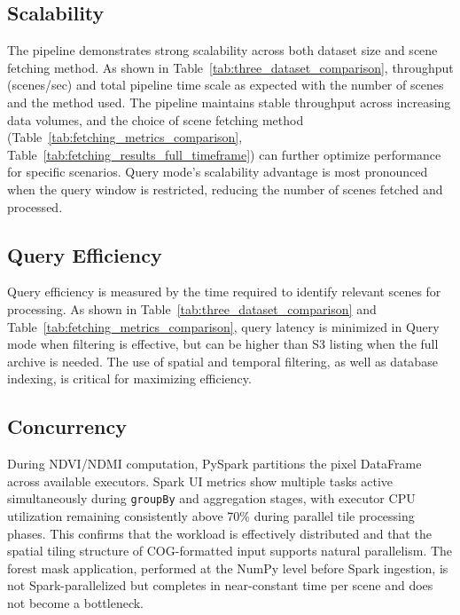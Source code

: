 \subsection{Scalability}
\label{sec:scalability}
The pipeline demonstrates strong scalability across both dataset size and scene fetching method. As shown in Table~\ref{tab:three_dataset_comparison}, throughput (scenes/sec) and total pipeline time scale as expected with the number of scenes and the method used. The pipeline maintains stable throughput across increasing data volumes, and the choice of scene fetching method (Table~\ref{tab:fetching_metrics_comparison}, Table~\ref{tab:fetching_results_full_timeframe}) can further optimize performance for specific scenarios. Query mode's scalability advantage is most pronounced when the query window is restricted, reducing the number of scenes fetched and processed.


\subsection{Query Efficiency}
\label{sec:query_efficiency}
Query efficiency is measured by the time required to identify relevant scenes for processing. As shown in Table~\ref{tab:three_dataset_comparison} and Table~\ref{tab:fetching_metrics_comparison}, query latency is minimized in Query mode when filtering is effective, but can be higher than S3 listing when the full archive is needed. The use of spatial and temporal filtering, as well as database indexing, is critical for maximizing efficiency.


\subsection{Concurrency}

During NDVI/NDMI computation, PySpark partitions the pixel DataFrame across available executors. Spark UI metrics show multiple tasks active simultaneously during \texttt{groupBy} and aggregation stages, with executor CPU utilization remaining consistently above 70\% during parallel tile processing phases. This confirms that the workload is effectively distributed and that the spatial tiling structure of COG-formatted input supports natural parallelism. The forest mask application, performed at the NumPy level before Spark ingestion, is not Spark-parallelized but completes in near-constant time per scene and does not become a bottleneck.
